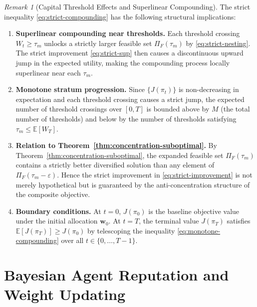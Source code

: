 \documentclass[12pt,openany]{book}
\newcommand{\bfw}{\mathbf{w}}
\newcommand{\E}{\mathbb{E}}
\numberwithin{equation}{chapter}
\theoremstyle{plain}
\theoremstyle{definition}
\theoremstyle{remark}
\newtheorem{remark}[theorem]{Remark}
\numberwithin{equation}{chapter}
\theoremstyle{plain}
\begin{document}
\begin{remark}[Capital Threshold Effects and Superlinear Compounding]
\label{rem:threshold-effects}
The strict inequality \eqref{eq:strict-compounding} has the
following structural implications:
\begin{enumerate}
  \item[\textup{(i)}] \textbf{Superlinear compounding near
        thresholds.}
        Each threshold crossing $W_t \geq \tau_m$ unlocks a
        strictly larger feasible set $\Pi_F(\tau_m)$ by
        \eqref{eq:strict-nesting}.  The strict improvement
        \eqref{eq:strict-sup} then causes a discontinuous upward
        jump in the expected utility, making the compounding
        process locally superlinear near each $\tau_m$.

  \item[\textup{(ii)}] \textbf{Monotone stratum progression.}
        Since $\{J(\pi_t)\}$ is non-decreasing in expectation
        and each threshold crossing causes a strict jump, the
        expected number of threshold crossings over $[0,T]$ is
        bounded above by $M$ (the total number of thresholds)
        and below by the number of thresholds satisfying
        $\tau_m \leq \E[W_T]$.

  \item[\textup{(iii)}] \textbf{Relation to
        Theorem~\ref{thm:concentration-suboptimal}.}
        By Theorem~\ref{thm:concentration-suboptimal}, the
        expanded feasible set $\Pi_F(\tau_m)$ contains a
        strictly better diversified solution than any element
        of $\Pi_F(\tau_m - \varepsilon)$.  Hence the strict
        improvement in \eqref{eq:strict-improvement} is not
        merely hypothetical but is guaranteed by the
        anti-concentration structure of the composite
        objective.

  \item[\textup{(iv)}] \textbf{Boundary conditions.}
        At $t = 0$, $J(\pi_0)$ is the baseline objective value
        under the initial allocation $\bfw_0$.  At $t = T$,
        the terminal value $J(\pi_T)$ satisfies
        $\E[J(\pi_T)] \geq J(\pi_0)$ by telescoping
        the inequality \eqref{eq:monotone-compounding} over all
        $t \in \{0,\ldots,T-1\}$.
\end{enumerate}
\end{remark}

\chapter{Bayesian Agent Reputation and Weight Updating}
\label{ch:reputation}
\end{document}
